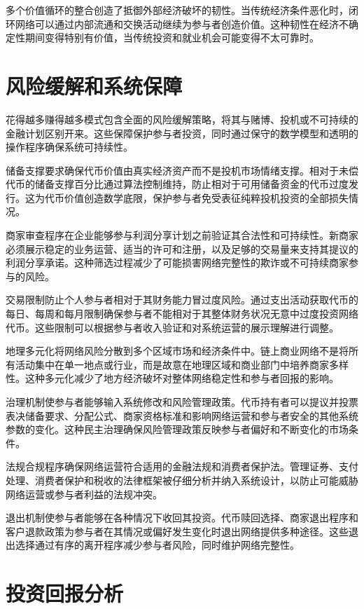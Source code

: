 \documentclass[
  Letterpaper,
]{scrbook}
\begin{document}
多个价值循环的整合创造了抵御外部经济破坏的韧性。当传统经济条件恶化时，闭环网络可以通过内部流通和交换活动继续为参与者创造价值。这种韧性在经济不确定性期间变得特别有价值，当传统投资和就业机会可能变得不太可靠时。

\section{风险缓解和系统保障}\label{ux98ceux9669ux7f13ux89e3ux548cux7cfbux7edfux4fddux969c}

花得越多赚得越多模式包含全面的风险缓解策略，将其与赌博、投机或不可持续的金融计划区别开来。这些保障保护参与者投资，同时通过保守的数学模型和透明的操作程序确保系统可持续性。

储备支撑要求确保代币价值由真实经济资产而不是投机市场情绪支撑。相对于未偿代币的储备支撑百分比通过算法控制维持，防止相对于可用储备资金的代币过度发行。这为代币价值创造数学底限，保护参与者免受表征纯粹投机投资的全部损失情况。

商家审查程序在企业能够参与利润分享计划之前验证其合法性和可持续性。新商家必须展示稳定的业务运营、适当的许可和注册，以及足够的交易量来支持其提议的利润分享承诺。这种筛选过程减少了可能损害网络完整性的欺诈或不可持续商家参与的风险。

交易限制防止个人参与者相对于其财务能力冒过度风险。通过支出活动获取代币的每日、每周和每月限制确保参与者不能相对于其整体财务状况无意中过度投资网络代币。这些限制可以根据参与者收入验证和对系统运营的展示理解进行调整。

地理多元化将网络风险分散到多个区域市场和经济条件中。链上商业网络不是将所有活动集中在单一地点或行业，而是故意在地理区域和商业部门中培养商家多样性。这种多元化减少了地方经济破坏对整体网络稳定性和参与者回报的影响。

治理机制使参与者能够输入系统修改和风险管理政策。代币持有者可以提议并投票表决储备要求、分配公式、商家资格标准和影响网络运营和参与者安全的其他系统参数的变化。这种民主治理确保风险管理政策反映参与者偏好和不断变化的市场条件。

法规合规程序确保网络运营符合适用的金融法规和消费者保护法。管理证券、支付处理、消费者保护和税收的法律框架被仔细分析并纳入系统设计，以防止可能威胁网络运营或参与者利益的法规冲突。

退出机制使参与者能够在各种情况下收回其投资。代币赎回选择、商家退出程序和客户退款政策为参与者在其情况或偏好发生变化时退出网络提供多种途径。这些退出选择通过有序的离开程序减少参与者风险，同时维护网络完整性。

\section{投资回报分析}\label{ux6295ux8d44ux56deux62a5ux5206ux6790}
\end{document}
